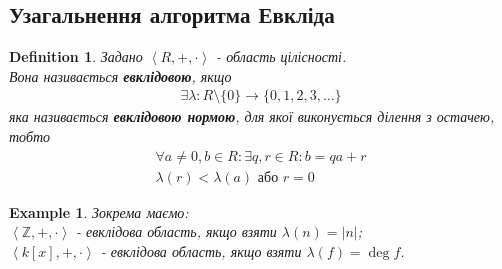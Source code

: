 \documentclass[a4paper, 10pt]{article}
\theoremstyle{theoremdd}
\theoremstyle{theoremdd}
\newtheorem{definition}[theorem]{Definition}
\theoremstyle{theoremdd}
\theoremstyle{theoremdd}
\newtheorem{example}[theorem]{Example}
\theoremstyle{theoremdd}
\theoremstyle{theoremdd}
\theoremstyle{theoremdd}
\theoremstyle{theoremdd}
\begin{document}
\subsection{Узагальнення алгоритма Евкліда}
\begin{definition}
Задано $\left<R,+,\cdot \right>$ - область цілісності.\\
Вона називається \textbf{евклідовою}, якщо
\begin{align*}
\exists \lambda: R \setminus \{0\} \to \{0,1,2,3,\dots\}
\end{align*}
яка називається \textbf{евклідовою нормою}, для якої виконується ділення з остачею, тобто
\begin{align*}
\forall a \neq 0,b \in R: \exists q,r \in R: b = qa + r \\
\lambda(r) < \lambda(a) \text{ або } r = 0
\end{align*}
\end{definition}

\begin{example}
Зокрема маємо:\\
$\left<\mathbb{Z},+,\cdot \right>$ - евклідова область, якщо взяти $\lambda(n) = |n|$;\\
$\left< k[x],+,\cdot \right>$ - евклідова область, якщо взяти $\lambda(f) = \deg f$.
\end{example}
\end{document}
